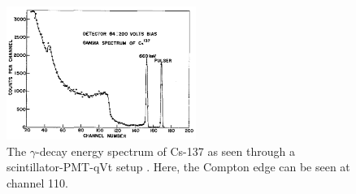 \begin{figure}
	\centerline{
		\mbox{\includegraphics[width=0.55\textwidth]{figures/cs-137.png}}
	}
	\caption{The $\gamma$-decay energy spectrum of Cs-137 as seen through a scintillator-PMT-qVt setup \cite{Webb_Williams_1963}. Here, the Compton edge can be seen at channel 110.}
	\label{fig:cs-137}
\end{figure}
